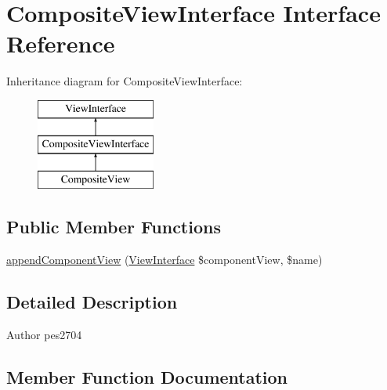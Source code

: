 \hypertarget{interface_pes_1_1_view_1_1_composite_view_interface}{}\section{Composite\+View\+Interface Interface Reference}
\label{interface_pes_1_1_view_1_1_composite_view_interface}
Inheritance diagram for Composite\+View\+Interface\+:\begin{figure}[H]
\begin{center}
\leavevmode
\includegraphics[height=3.000000cm]{interface_pes_1_1_view_1_1_composite_view_interface}
\end{center}
\end{figure}
\subsection*{Public Member Functions}
\begin{DoxyCompactItemize}
\item 
\mbox{\hyperlink{interface_pes_1_1_view_1_1_composite_view_interface_a2ab16e76a45210ebd3f14c0df914f3b9}{append\+Component\+View}} (\mbox{\hyperlink{interface_pes_1_1_view_1_1_view_interface}{View\+Interface}} \$component\+View, \$name)
\end{DoxyCompactItemize}


\subsection{Detailed Description}
\begin{DoxyAuthor}{Author}
pes2704 
\end{DoxyAuthor}


\subsection{Member Function Documentation}
\mbox{\label{interface_pes_1_1_view_1_1_composite_view_interface_a2ab16e76a45210ebd3f14c0df914f3b9}} 
